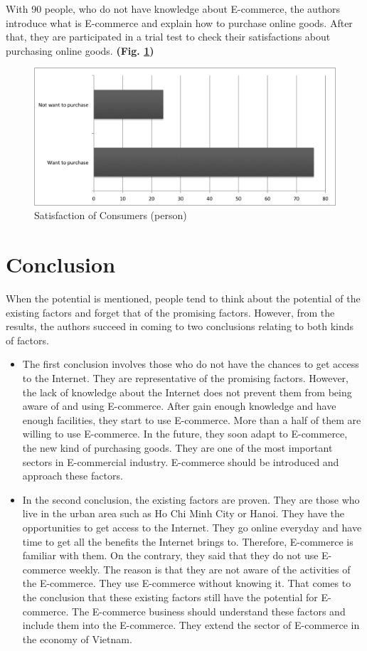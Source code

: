 \documentclass[conference]{IEEEtran}
\begin{document}
With 90 people, who do not have knowledge about E-commerce, the authors introduce what is E-commerce and explain how to purchase online goods. After that, they are participated in a trial test to check their satisfactions about purchasing online goods. \textbf{(Fig. \ref{fig:satisfaction})}

\begin{figure}[tbph]
\centering
\includegraphics[width=0.7\linewidth]{./satisfaction}
\caption{Satisfaction of Consumers (person)}
\label{fig:satisfaction}
\end{figure}






\section{Conclusion} \label{conclusion}
When the potential is mentioned, people tend to think about the potential of the existing factors and forget that of the promising factors. However, from the results, the authors succeed in coming to two conclusions relating to both kinds of factors.

\begin{itemize}
\item The first conclusion involves those who do not have the chances to get access to the Internet. They are representative of the promising factors. However, the lack of knowledge about the Internet does not prevent them from being aware of and using E-commerce. After gain enough knowledge and have enough facilities, they start to use E-commerce. More than a half of them are willing to use E-commerce. In the future, they soon adapt to E-commerce, the new kind of purchasing goods. They are one of the most important sectors in E-commercial industry. E-commerce should be introduced and approach these factors.
\item In the second conclusion, the existing factors are proven. They are those who live in the urban area such as Ho Chi Minh City or Hanoi. They have the opportunities to get access to the Internet. They go online everyday and have time to get all the benefits the Internet brings to. Therefore, E-commerce is familiar with them. On the contrary, they said that they do not use E-commerce weekly. The reason is that they are not aware of the activities of the E-commerce. They use E-commerce without knowing it. That comes to the conclusion that these existing factors still have the potential for E-commerce. The E-commerce business should understand these factors and include them into the E-commerce. They extend the sector of E-commerce in the economy of Vietnam.

\end{itemize}
\end{document}
